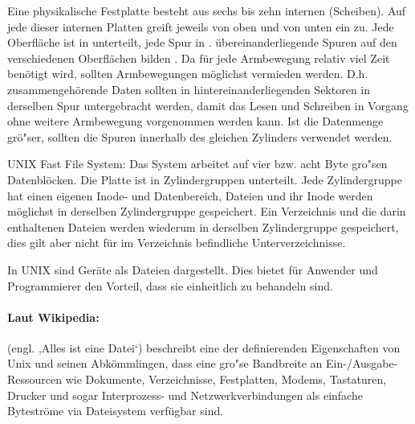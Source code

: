 \begin{answer}
  Eine physikalische Festplatte besteht aus sechs bis zehn internen  (Scheiben). Auf jede
  dieser internen Platten greift jeweils von oben und von unten ein  zu. Jede
  Oberfläche ist in  unterteilt, jede Spur in . übereinanderliegende Spuren auf den
  verschiedenen Oberflächen bilden . Da für jede Armbewegung relativ viel Zeit benötigt
  wird, sollten Armbewegungen möglichst vermieden werden. D.h. zusammengehörende Daten sollten
  in hintereinanderliegenden Sektoren in derselben Spur untergebracht werden, damit das Lesen
  und Schreiben in Vorgang ohne weitere Armbewegung vorgenommen werden kann. Ist die Datenmenge
  grö"ser, sollten die Spuren innerhalb des gleichen Zylinders verwendet werden.

  UNIX Fast File System:
  Das System arbeitet auf vier bzw. acht Byte gro"sen Datenblöcken. Die Platte ist in Zylindergruppen unterteilt. Jede Zylindergruppe hat einen eigenen Inode- und Datenbereich, Dateien und ihr Inode werden möglichst in derselben Zylindergruppe gespeichert. Ein Verzeichnis und die darin enthaltenen Dateien werden wiederum in derselben Zylindergruppe gespeichert, dies gilt aber nicht für im Verzeichnis befindliche Unterverzeichnisse.
\end{answer}

\begin{answer}
  In UNIX sind Geräte als Dateien dargestellt. Dies bietet für Anwender und Programmierer den
  Vorteil, dass sie einheitlich zu behandeln sind.

  \paragraph*{Laut Wikipedia:}
   (engl. ‚Alles ist eine Datei‘) beschreibt eine der definierenden Eigenschaften von Unix und seinen Abkömmlingen, dass eine gro"se Bandbreite an Ein-/Ausgabe-Ressourcen wie Dokumente, Verzeichnisse, Festplatten, Modems, Tastaturen, Drucker und sogar Interprozess- und Netzwerkverbindungen als einfache Byteströme via Dateisystem verfügbar sind.
\end{answer}


